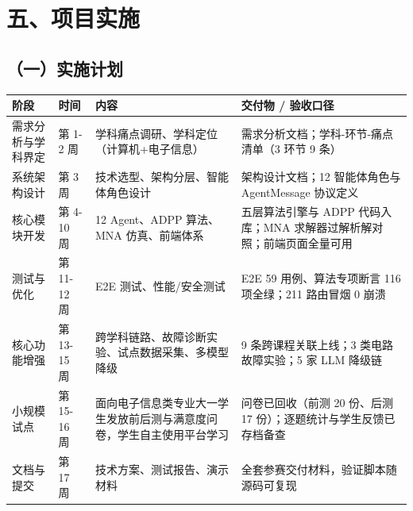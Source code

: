\documentclass[zihao=-4,a4paper,UTF8,fontset=windows]{ctexart}
\begin{document}
\par\noindent\begin{minipage}{\linewidth}
\section{五、项目实施}
\subsection{（一）实施计划}
\par\noindent\begin{tabular}{|p{2.5cm}|p{2.5cm}|p{4.0cm}|p{4.3cm}|}
\hline
\textbf{阶段} & \textbf{时间} & \textbf{内容} & \textbf{交付物 / 验收口径} \\ \hline
需求分析与学科界定 & 第 1-2 周 & 学科痛点调研、学科定位（计算机+电子信息） & 需求分析文档；学科-环节-痛点清单（3 环节 9 条） \\ \hline
系统架构设计 & 第 3 周 & 技术选型、架构分层、智能体角色设计 & 架构设计文档；12 智能体角色与 AgentMessage 协议定义 \\ \hline
核心模块开发 & 第 4-10 周 & 12 Agent、ADPP 算法、MNA 仿真、前端体系 & 五层算法引擎与 ADPP 代码入库；MNA 求解器过解析解对照；前端页面全量可用 \\ \hline
测试与优化 & 第 11-12 周 & E2E 测试、性能/安全测试 & E2E 59 用例、算法专项断言 116 项全绿；211 路由冒烟 0 崩溃 \\ \hline
核心功能增强 & 第 13-15 周 & 跨学科链路、故障诊断实验、试点数据采集、多模型降级 & 9 条跨课程关联上线；3 类电路故障实验；5 家 LLM 降级链 \\ \hline
小规模试点 & 第 15-16 周 & 面向电子信息类专业大一学生发放前后测与满意度问卷，学生自主使用平台学习 & 问卷已回收（前测 20 份、后测 17 份）；逐题统计与学生反馈已存档备查 \\ \hline
文档与提交 & 第 17 周 & 技术方案、测试报告、演示材料 & 全套参赛交付材料，验证脚本随源码可复现 \\ \hline
\end{tabular}\par
\end{minipage}\par
\end{document}
